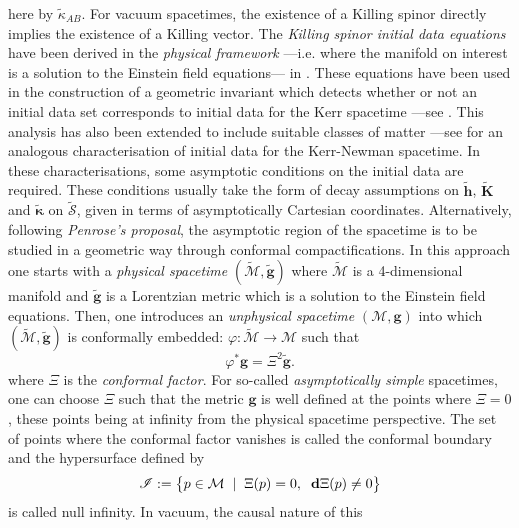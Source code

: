 \documentclass[10pt,a4paper]{article}
\theoremstyle{plain}
\def\bmg{{\bm g}}
\def\bmh{{\bm h}}
\def\bmK{{\bm K}}
\begin{document}
here by $\tilde{\kappa}_{AB}$. For vacuum spacetimes, the existence of
a Killing spinor directly implies the existence of a Killing
vector. The \emph{Killing spinor initial data equations} have been
derived in the \emph{physical framework} ---i.e. where the manifold on interest is a solution to the Einstein
field equations--- in \cite{GarVal08c}. These equations have been
used in the construction of a geometric invariant which detects
whether or not an initial data set corresponds to initial data for the
Kerr spacetime ---see \cite{BaeVal10a,BaeVal10b,BaeVal10c,BaeVal11b}.
This analysis has also been extended to include suitable classes of
matter ---see \cite{ValCol16} for an analogous characterisation of
initial data for the Kerr-Newman spacetime.  In these
characterisations, some asymptotic conditions on the initial data are
required. These conditions usually take the form of decay assumptions
on $\tilde{\bmh}$, $\tilde{\bmK}$ and $\tilde{\bm\kappa}$ on
$\tilde{\mathcal{S}}$, given in terms of asymptotically Cartesian
coordinates.  Alternatively, following \emph{Penrose's proposal}, the
asymptotic region of the spacetime is to be studied in a geometric way
through conformal compactifications.  In this approach one starts with
a \emph{physical spacetime} $(\tilde{\mathcal{M}},\tilde{\bmg})$ where
$\tilde{\mathcal{M}}$ is a 4-dimensional manifold and $\tilde{\bmg}$
is a Lorentzian metric which is a solution to the Einstein field
equations.  Then, one introduces an \emph{unphysical spacetime}
$(\mathcal{M},\bmg)$ into which $(\tilde{\mathcal{M}},\tilde{\bmg})$
is conformally embedded:
$\varphi: \tilde{\mathcal{M}} \rightarrow \mathcal{M}$ such that
\begin{equation} \label{eqn:Chapter:Introduction:ConformalRescaling}
\varphi^{*}\bmg=\Xi^2\tilde{\bmg}.
\end{equation}
where $\Xi$ is the \emph{conformal factor}. For so-called \emph{asymptotically simple} spacetimes, one can choose $\Xi$ such that the metric
 $\bmg$ is well defined at the points where $\Xi=0$, these points being at infinity from the physical spacetime perspective.
 \noindent The set of points where the conformal factor vanishes
 is called the conformal boundary and the hypersurface defined by
\[
 \mathscr{I} := \big\{p \in \mathcal{M} \hspace{0.2cm}| \hspace{0.2cm}
 \Xi(p)=0 , \hspace{0.2cm} \mathbf{d}\Xi(p) \neq0\big\}
\]
is called null infinity. In vacuum, the causal nature of this
\end{document}
